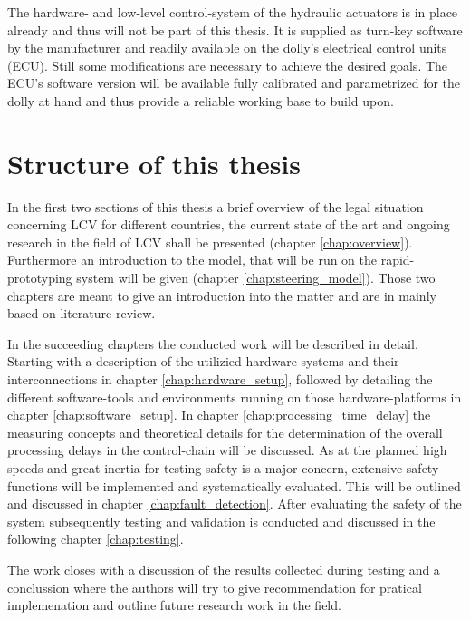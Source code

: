 \documentclass[ExampleMasters.tex]{subfiles}
\begin{document}
The hardware- and low-level control-system of the hydraulic actuators is in place already and thus will not be part of this thesis. It is supplied as turn-key software by the manufacturer and readily available on the dolly's electrical control units (ECU). Still some modifications are necessary to achieve the desired goals. The ECU's software version will be available fully calibrated and parametrized for the dolly at hand and thus provide a reliable working base to build upon. 


\section{Structure of this thesis}
\label{sec:structure}

In the first two sections of this thesis a brief overview of the legal situation concerning LCV for different countries, the current state of the art and ongoing research in the field of LCV shall be presented (chapter \ref{chap:overview}). Furthermore an introduction to the model, that will be run on the rapid-prototyping system will be given (chapter \ref{chap:steering_model}). Those two chapters are meant to give an introduction into the matter and are in mainly based on literature review. 

In the succeeding chapters the conducted work will be described in detail. Starting with a description of the utilizied hardware-systems and their interconnections in chapter \ref{chap:hardware_setup}, followed by detailing the different software-tools and environments running on those hardware-platforms in chapter \ref{chap:software_setup}. In chapter \ref{chap:processing_time_delay} the measuring concepts and theoretical details for the determination of the overall processing delays in the control-chain will be discussed. As at the planned high speeds and great inertia for testing safety is a major concern, extensive safety functions will be implemented and systematically evaluated. This will be outlined and discussed in chapter \ref{chap:fault_detection}. After evaluating the safety of the system subsequently testing and validation is conducted and discussed in the following chapter  \ref{chap:testing}. 

The work closes with a discussion of the results collected during testing and a conclussion where the authors will try to give recommendation for pratical implemenation and outline future research work in the field.
\end{document}
